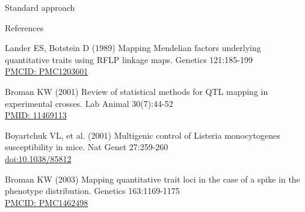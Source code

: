\documentclass[aspectratio=169,12pt,t]{beamer}
\begin{document}
\begin{frame}{Standard approach}


\end{frame}




\begin{frame}{References}
\vspace{-7mm}

  \bbi

\item Lander ES, Botstein D (1989) Mapping Mendelian factors
  underlying quantitative traits using RFLP linkage maps. Genetics
  121:185-199 \\
  \href{https://www.ncbi.nlm.nih.gov/pmc/articles/PMC1203601}{\footnotesize
    PMCID: PMC1203601}

\item Broman KW (2001) Review of statistical methods for QTL mapping
  in experimental crosses. Lab Animal 30(7):44-52 \\
  \href{https://www.ncbi.nlm.nih.gov/pubmed/11469113}{\footnotesize
    PMID: 11469113}

\item Boyartchuk VL, et al. (2001) Multigenic control of Listeria monocytogenes
  susceptibility in mice. Nat Genet 27:259-260 \\
  \href{https://doi.org/10.1038/85812}{\footnotesize doi:10.1038/85812}

\item Broman KW (2003) Mapping quantitative trait loci in the case
  of a spike in the phenotype distribution. Genetics 163:1169-1175 \\
  \href{https://www.ncbi.nlm.nih.gov/pmc/articles/PMC1462498}{\footnotesize
    PMCID: PMC1462498}

\ei




\end{frame}
\end{document}
